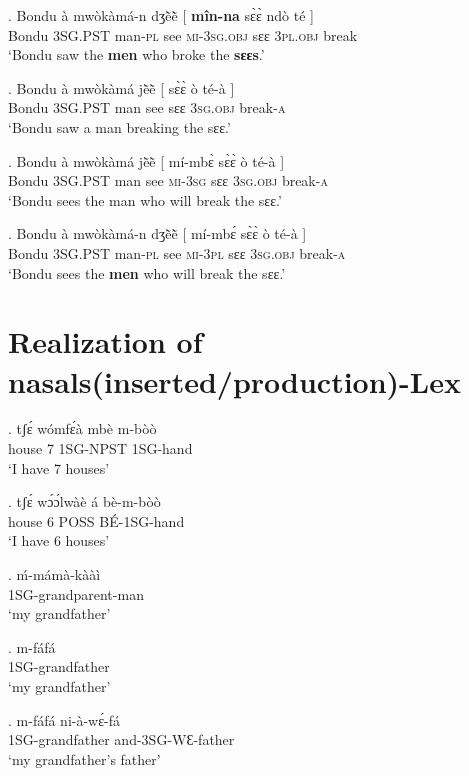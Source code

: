 \documentclass{assets/fieldnotes}
\begin{document}
\exg. Bondu à mwòkàmá-n dʒẽ̀ẽ̀ {[} \textbf{mîn-na} sɛ̀ɛ̀ ndò té {]}\\
Bondu \textsc{3SG.PST} man-\textsc{pl} see {} \textsc{mi}-\textsc{3sg.obj} sɛɛ \textsc{3pl.obj} break {}\\ `Bondu saw the \textbf{men} who broke the \textbf{sɛɛs}.'

\exg. Bondu à mwòkàmá jẽ̀ẽ̀ {[} sɛ̀ɛ̀ ò té-à {]}\\
Bondu \textsc{3SG.PST} man see {} sɛɛ \textsc{3sg.obj} break-\textsc{a} {}\\ `Bondu saw a man breaking the sɛɛ.'

\exg. Bondu à mwòkàmá jẽ̀ẽ̀ {[} mí-mbɛ̀ sɛ̀ɛ̀ ò té-à {]}\\
Bondu \textsc{3SG.PST} man see {} \textsc{mi}-\textsc{3sg} sɛɛ \textsc{3sg.obj} break-\textsc{a} {}\\ `Bondu sees the man who will break the sɛɛ.'

\exg. Bondu à mwòkàmá-n dʒẽ̀ẽ̀ {[} mí-mbɛ́ sɛ̀ɛ̀ ò té-à {]}\\
Bondu \textsc{3SG.PST} man-\textsc{pl} see {} \textsc{mi}-\textsc{3pl} sɛɛ \textsc{3sg.obj} break-\textsc{a} {}\\ `Bondu sees the \textbf{men} who will break the sɛɛ.'

\section{Realization of nasals(inserted/production)-Lex}

\exg. tʃɛ́    wómfɛ́à mbè m-bòò\\
      house  7      1SG-NPST 1SG-hand\\
`I have 7 houses'


\exg. tʃɛ́ wɔ́ɔ́lwàè á bè-m-bòò\\
house  6  POSS BÉ-1SG-hand\\
`I have 6 houses'

\exg. \'{m}-m\'{a}m\`{a}-k\`{a}\`{a}\`{i} \\
1SG-grandparent-man \\
`my grandfather'

\exg. m-fáfá\\
1SG-grandfather\\
`my grandfather'

\exg. m-fáfá ni-à-wɛ́-fá\\
1SG-grandfather and-3SG-WƐ-father\\
`my grandfather's father'
\end{document}
